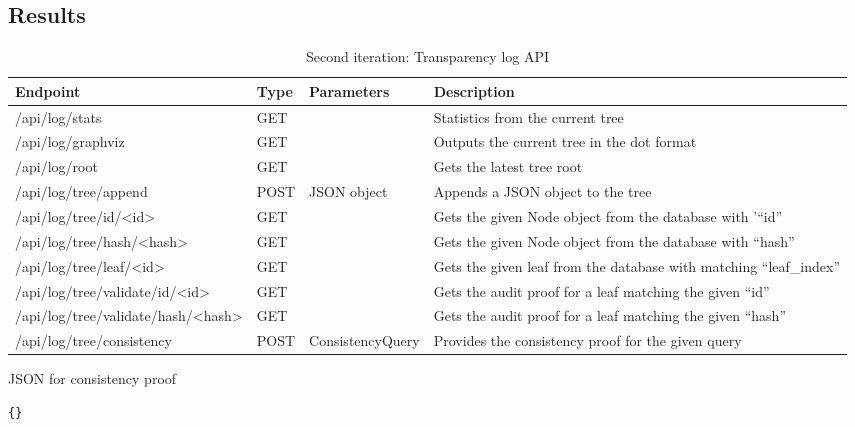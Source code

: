 \documentclass[../Main/thesis.tex]{subfiles}
\begin{document}
\subsection*{Results}%
\label{sub:second_iteration_results}


\begin{table}[H]
\footnotesize
\centering
\settowidth{}
\setlength\extrarowheight{2pt}
\begin{tabulary}{1.0\textwidth}{|l|L|l|L|}
\hline
    \textbf{Endpoint} & 
    \textbf{Type} & 
    \textbf{Parameters} & 
    \textbf{Description} \\
\hline
    /api/log/stats & GET & & Statistics from the current tree \\ \hline
    /api/log/graphviz & GET & & Outputs the current tree in the dot format \\ \hline
    /api/log/root & GET & & Gets the latest tree root \\ \hline
    /api/log/tree/append & POST & JSON object & Appends a JSON object to the tree \\ \hline
    /api/log/tree/id/<id> & GET & & Gets the given Node object from the database with '``id''\\ \hline
    /api/log/tree/hash/<hash> & GET & & Gets the given Node object from the database with ``hash''\\ \hline
    /api/log/tree/leaf/<id> & GET & & Gets the given leaf from the database with matching ``leaf\_index''\\ \hline
    /api/log/tree/validate/id/<id> & GET & & Gets the audit proof for a leaf matching the given ``id''\\ \hline
    /api/log/tree/validate/hash/<hash> & GET & & Gets the audit proof for a leaf matching the given ``hash''\\ \hline
    /api/log/tree/consistency & POST & ConsistencyQuery & Provides the consistency proof for the given query\\ \hline
\end{tabulary}
\caption{Second iteration: Transparency log API}
\label{api:transparency_log}
\end{table}


\begin{listing}[H]
\caption{JSON for consistency proof}
\label{lst:consistency proof}
\begin{verbatim}
{}
\end{verbatim}
\end{listing}
\end{document}

